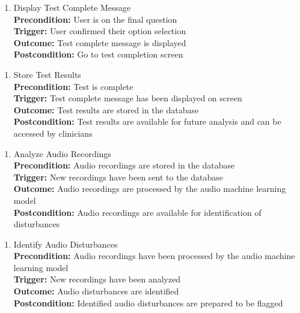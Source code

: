 \documentclass[12pt]{article}
\begin{document}
\begin{enumerate}[label={PUC-}21. ]
  \item Display Test Complete Message\\
  \textbf{Precondition: }User is on the final question\\
  \textbf{Trigger: }User confirmed their option selection\\
  \textbf{Outcome: }Test complete message is displayed\\
  \textbf{Postcondition: }Go to test completion screen\\
\end{enumerate}

\begin{enumerate}[label={PUC-}22. ]
  \item Store Test Results\\
  \textbf{Precondition: }Test is complete\\
  \textbf{Trigger: }Test complete message has been displayed on screen\\
  \textbf{Outcome: }Test results are stored in the database\\
  \textbf{Postcondition: }Test results are available for future analysis and can be accessed by clinicians\\
\end{enumerate}

\begin{enumerate}[label={PUC-}23. ]
  \item Analyze Audio Recordings\\
  \textbf{Precondition: }Audio recordings are stored in the database\\
  \textbf{Trigger: }New recordings have been sent to the database\\
  \textbf{Outcome: }Audio recordings are processed by the audio machine learning model\\
  \textbf{Postcondition: }Audio recordings are available for identification of disturbances\\
\end{enumerate}

\begin{enumerate}[label={PUC-}24. ]
  \item Identify Audio Disturbances\\
  \textbf{Precondition: }Audio recordings have been processed by the audio machine learning model\\
  \textbf{Trigger: }New recordings have been analyzed\\
  \textbf{Outcome: }Audio disturbances are identified\\
  \textbf{Postcondition: }Identified audio disturbances are prepared to be flagged\\
\end{enumerate}
\end{document}
